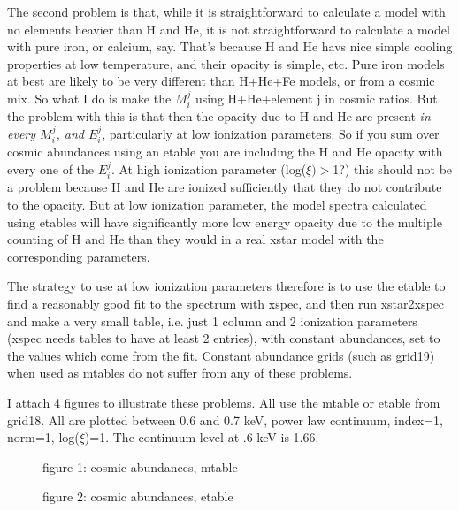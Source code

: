 The second problem is that, while it is straightforward to calculate 
a model with no elements heavier than H and He, 
it is not straightforward to calculate a 
model with pure iron, or calcium, say.  That's because H and He havs nice 
simple cooling properties at low temperature, and their opacity is simple, 
etc.  Pure iron models at best are likely to be very different than 
H+He+Fe models, or from a cosmic mix.  So what I do is  make the $M_i^j$ 
using H+He+element j in cosmic ratios.  But the problem with this is that 
then the opacity due to H and He are present 
{\em in every $M_i^j$, and $E_i^j$}, 
particularly at low ionization parameters.  So if you sum over cosmic 
abundances using an etable you are including the H and He opacity with 
every one of the $E_i^j$.  At high ionization parameter (log($\xi)>$1?) 
this 
should not be a problem because H and He are ionized sufficiently that they do 
not contribute to the opacity.  But at low ionization parameter, the 
model spectra calculated using etables will have significantly more 
low energy opacity due to the multiple counting of H and He than they 
would in a real xstar model with the corresponding parameters.  

The strategy to use at low ionization parameters therefore
is to use the etable to find a reasonably good fit to the 
spectrum with xspec, and then run xstar2xspec and make a very small table, 
i.e. just 1 column and 2 ionization parameters (xspec needs tables to 
have at least 2 entries), with  constant abundances, set to the values 
which come from the fit.  Constant abundance grids (such as grid19) when used 
as mtables do not suffer from any of these problems.

I attach 4 figures to illustrate these problems.  All use the mtable or 
etable from grid18.  All are plotted between 0.6 and 0.7 keV, power law 
continuum, index=1, norm=1, log($\xi$)=1.  The continuum level at .6 keV is 1.66.



\begin{figure}
\epsfxsize=5.6in  %
\epsfysize=7.0in  %
\caption{figure 1: cosmic abundances, mtable}
\label{fig:1 cosmic abundances, mtable}
\end{figure}


\begin{figure}
\epsfxsize=5.6in  %
\epsfysize=7.0in  %
\caption{figure 2: cosmic abundances, etable}
\label{fig:2 cosmic abundances, etable}
\end{figure}


